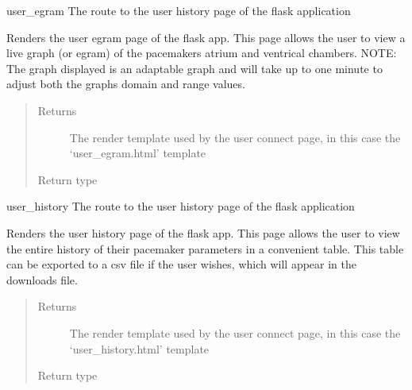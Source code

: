 \documentclass[letterpaper,10pt,english]{sphinxmanual}
\begin{document}

\begin{fulllineitems}
\label{\detokenize{index:app.user_egram}}
user\_egram The route to the user history page of the flask application

Renders the user egram page of the flask app. This page allows the user to
view a live graph (or egram) of the pacemakers atrium and ventrical chambers.
NOTE: The graph displayed is an adaptable graph and will take up to one minute
to adjust both the graphs domain and range values.
\begin{quote}\begin{description}
\item[{Returns}] \leavevmode
The render template used by the user connect page, in this case the ‘user\_egram.html’ template

\item[{Return type}] \leavevmode
{}

\end{description}\end{quote}

\end{fulllineitems}


\begin{fulllineitems}
\label{\detokenize{index:app.user_history}}
user\_history The route to the user history page of the flask application

Renders the user history page of the flask app. This page allows the user to
view the entire history of their pacemaker parameters in a convenient table.
This table can be exported to a csv file if the user wishes, which will appear
in the downloads file.
\begin{quote}\begin{description}
\item[{Returns}] \leavevmode
The render template used by the user connect page, in this case the ‘user\_history.html’ template

\item[{Return type}] \leavevmode
{}

\end{description}\end{quote}

\end{fulllineitems}
\end{document}
